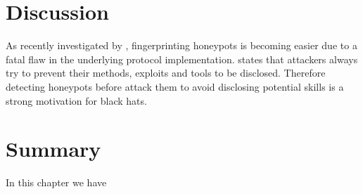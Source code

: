\section{Discussion}

As recently investigated by \citet{vetterl2020}, fingerprinting honeypots is becoming easier due to a fatal flaw in the underlying protocol implementation.
\citet{vetterl2020} states that attackers always try to prevent their methods, exploits and tools to be disclosed.
Therefore detecting honeypots before attack them to avoid disclosing potential skills is a strong motivation for black hats.


\section{Summary}

In this chapter we have
